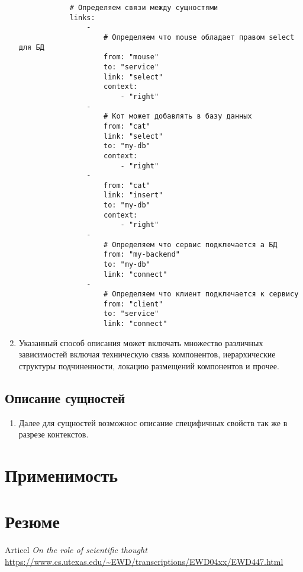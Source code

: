 \documentclass[final]{article}
\begin{document}
\begin{enumerate}
\begin{verbatim}
            # Определяем связи между сущностями
            links:         
                - 
                    # Определяем что mouse обладает правом select для БД
                    from: "mouse" 
                    to: "service"
                    link: "select"
                    context: 
                        - "right"
                -              
                    # Кот может добавлять в базу данных
                    from: "cat"
                    link: "select"
                    to: "my-db"
                    context: 
                        - "right"
                -              
                    from: "cat"
                    link: "insert"
                    to: "my-db"
                    context: 
                        - "right"
                -
                    # Определяем что сервис подключается а БД
                    from: "my-backend"
                    to: "my-db"
                    link: "connect"
                -
                    # Определяем что клиент подключается к сервису
                    from: "client"
                    to: "service"
                    link: "connect"

            \end{verbatim}

            \item Указанный способ описания может включать множество различных 
            зависимостей включая техническую связь компонентов, иерархические 
            структуры подчиненности, локацию размещений компонентов и прочее.
 
        \end{enumerate}



    \subsection{Описание сущностей}
        \begin{enumerate}

            \item Далее для сущностей возможнос описание специфичных свойств
            так же в разрезе контекстов.


        \end{enumerate}
        


    \section{Применимость}
        

    \section{Резюме}

    \renewcommand{\refname}{Список литературы}
    \begin{thebibliography}{9}

         Articel
        \textit{On the role of scientific thought}
        \url{https://www.cs.utexas.edu/~EWD/transcriptions/EWD04xx/EWD447.html}

    \end{thebibliography}
\end{document}

